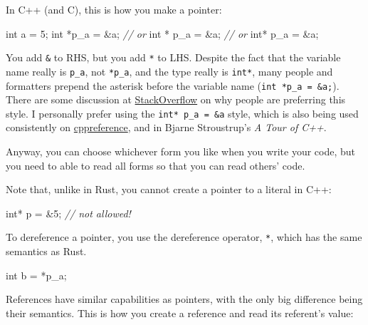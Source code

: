 \documentclass[
]{book}
\newenvironment{Shaded}{\begin{snugshade}}{\end{snugshade}}
\newcommand{\CommentTok}[1]{\textcolor[rgb]{0.56,0.35,0.01}{\textit{#1}}}
\newcommand{\DataTypeTok}[1]{\textcolor[rgb]{0.13,0.29,0.53}{#1}}
\newcommand{\DecValTok}[1]{\textcolor[rgb]{0.00,0.00,0.81}{#1}}
\newcommand{\NormalTok}[1]{#1}
\begin{document}
In C++ (and C), this is how you make a pointer:

\begin{Shaded}
\begin{Highlighting}[]
\DataTypeTok{int}\NormalTok{    a =  }\DecValTok{5}\NormalTok{;}
\DataTypeTok{int}\NormalTok{ *p\_a = \&a;}
\CommentTok{// or}
\DataTypeTok{int}\NormalTok{ * p\_a = \&a;}
\CommentTok{// or}
\DataTypeTok{int}\NormalTok{*  p\_a = \&a;}
\end{Highlighting}
\end{Shaded}

You add \texttt{\&} to RHS, but you add \texttt{*} to LHS. Despite the fact that the variable name really is \texttt{p\_a}, not \texttt{*p\_a}, and the type really is \texttt{int*}, many people and formatters prepend the asterisk before the variable name (\texttt{int\ *p\_a\ =\ \&a;}). There are some discussion at \href{https://stackoverflow.com/questions/398395/why-is-the-asterisk-before-the-variable-name-rather-than-after-the-type}{StackOverflow} on why people are preferring this style. I personally prefer using the \texttt{int*\ p\_a\ =\ \&a} style, which is also being used consistently on \href{https://en.cppreference.com/w/cpp/language/pointer}{cppreference}, and in Bjarne Stroustrup's \emph{A Tour of C++}.

Anyway, you can choose whichever form you like when you write your code, but you need to able to read all forms so that you can read others' code.

Note that, unlike in Rust, you cannot create a pointer to a literal in C++:

\begin{Shaded}
\begin{Highlighting}[]
\DataTypeTok{int}\NormalTok{* p = \&}\DecValTok{5}\NormalTok{; }\CommentTok{// not allowed!}
\end{Highlighting}
\end{Shaded}

To dereference a pointer, you use the dereference operator, \texttt{*}, which has the same semantics as Rust.

\begin{Shaded}
\begin{Highlighting}[]
\DataTypeTok{int}\NormalTok{ b = *p\_a;}
\end{Highlighting}
\end{Shaded}

References have similar capabilities as pointers, with the only big difference being their semantics.
This is how you create a reference and read its referent's value:
\end{document}
